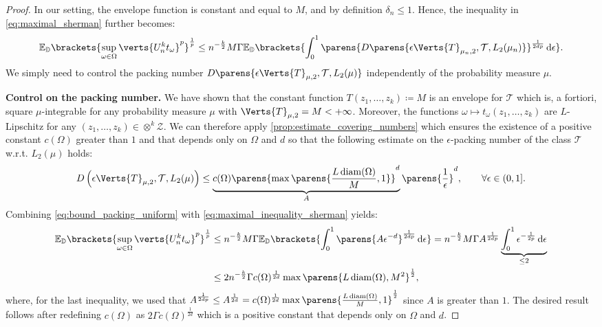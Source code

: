 \begin{proof}
In our setting, the envelope function is constant and equal to $M$, and by definition $\delta_n \leq 1$. Hence, the inequality in  \cref{eq:maximal_sherman} further becomes:
\begin{align}\label{eq:maximal_inequality_sherman}
	\mathbb{E}_{\PP}\brackets{\sup_{\omega\in \Omega} \verts{U_n^k t_{\omega}}^p}^{\frac{1}{p}}\leq n^{-\frac{k}{2}} M\Gamma 
	\mathbb{E}_{\PP}\brackets{ \int_{0}^{1} \parens{D\parens{\epsilon\Verts{T}_{\mu_n,2},\mathcal{T},L_2(\mu_n) }}^{\frac{1}{2dp}}\diff \epsilon  }. 
\end{align}
 We simply need to control the packing number $D\parens{\epsilon\Verts{T}_{\mu,2},\mathcal{T},L_2(\mu)}$ independently of the probability measure $\mu$.  

{\bf Control on the packing number.} 
We have shown that the constant function $T(z_1,\ldots,z_k) \coloneqq M$ is an envelope for $\mathcal{T}$ which is, a fortiori, square $\mu$-integrable for any probability measure $\mu$ with $\Verts{T}_{\mu,2}= M<+\infty$. 
 Moreover, the functions $\omega\mapsto t_{\omega}(z_1,\ldots,z_k)$ are $L$-Lipschitz for any $(z_1,\ldots,z_k)\in \otimes^k\mathcal{Z}$. 
 We can therefore apply \cref{prop:estimate_covering_numbers} which ensures the existence of a positive constant $c(\Omega)$ greater than $1$ and that depends only on $\Omega$ and $d$ so that the following estimate on the $\epsilon$-packing number of the class $\mathcal{T}$ w.r.t. $L_2(\mu)$ holds:
\begin{align}\label{eq:bound_packing_uniform}
D\left(\epsilon\Verts{T}_{\mu,2},\mathcal{T},L_2(\mu)\right)\leq \underbrace{c(\Omega)\parens{\max\parens{\frac{L\diam(\Omega)}{M},1}}^d}_{A}\parens{\frac{1}{\epsilon}}^d, \qquad \forall\epsilon\in(0,  1].
\end{align}
Combining \cref{eq:bound_packing_uniform} with \cref{eq:maximal_inequality_sherman} yields:
\begin{align*}
	\mathbb{E}_{\PP}\brackets{\sup_{\omega\in \Omega} \verts{U_n^k t_{\omega}}^p}^{\frac{1}{p}}&\leq n^{-\frac{k}{2}} M\Gamma 
	\mathbb{E}_{\PP}\brackets{ \int_{0}^{1} \parens{A\epsilon^{-d}
	}^{\frac{1}{2dp}}\diff \epsilon} = n^{-\frac{k}{2}}M\Gamma A^{\frac{1}{2dp}} \underbrace{\int_0^1 \epsilon^{-\frac{1}{2p}}\diff \epsilon}_{\leq 2} \\
	&\leq  
	 2n^{-\frac{k}{2}}\Gamma c(\Omega)^{\frac{1}{2d}}\max\parens{L\diam(\Omega),M^2}^{\frac{1}{2}},
\end{align*}
where, for the last inequality, we used that $A^{\frac{1}{2dp}}\leq A^{\frac{1}{2d}} = c(\Omega)^{\frac{1}{2d}}\max\parens{\frac{L\diam(\Omega)}{M},1}^{\frac{1}{2}}$ since $A$ is greater than $1$. 
The desired result follows after redefining $c(\Omega)$ as $2\Gamma c(\Omega)^{\frac{1}{2d}}$ which is  a positive constant that depends only on $\Omega$ and $d$. 
\end{proof}

